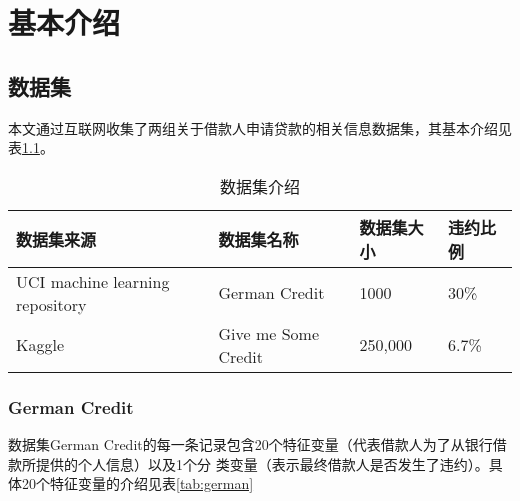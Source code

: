 \chapter{基本介绍}

\section{数据集}

本文通过互联网收集了两组关于借款人申请贷款的相关信息数据集，其基本介绍见表\ref{tab:dataset}。

\begin{table}[htbp]
	\centering
    \caption{\label{tab:dataset}数据集介绍}
    \begin{tabular}{llll}
        \toprule
          数据集来源                      & 数据集名称          & 数据集大小 & 违约比例 \\
        \midrule
		  UCI machine learning repository & German Credit       & 1000       & 30\% \\
		  Kaggle                          & Give me Some Credit & 250,000    & 6.7\% \\
        \bottomrule
    \end{tabular}
\end{table}

\subsection{German Credit}

数据集German Credit的每一条记录包含20个特征变量（代表借款人为了从银行借款所提供的个人信息）以及1个分
类变量（表示最终借款人是否发生了违约）。具体20个特征变量的介绍见表\ref{tab:german}

